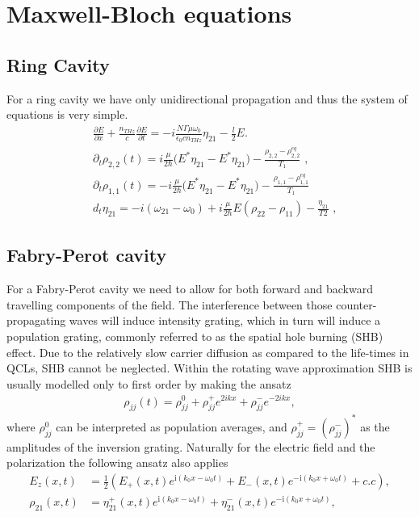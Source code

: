 \documentclass[preprint,secnumarabic,amssymb, nobibnotes, aip, prd]{revtex4-1}
\def\p{\partial}
\begin{document}
	\section{Maxwell-Bloch equations}
	\subsection{Ring Cavity}
	For a ring cavity we have only unidirectional propagation and thus the system of equations is very simple.  
	\begin{align}
	& \frac{\p E}{\p x}+ \frac{n_{THz}}{c} \frac{\p E}{\p t} = -i\frac{N\Gamma\mu\omega_0}{\epsilon_0 c n_{THz}}\eta_{21}-\frac{l}{2}E.
	\\
	& \partial_t {\rho_{2,2}(t)} = i\frac{ \mu }{2 \hbar} \Big ( E^* \eta_{21} - E^*\eta_{21} \Big) -\frac{\rho_{2,2}-\rho_{2,2}^{eq}}{T_1}\text{  ,}
	\\
	& \partial_t {\rho_{1,1}(t)} = - i\frac{ \mu }{2 \hbar} \Big ( E^* \eta_{21} - E^*\eta_{21} \Big) -\frac{\rho_{1,1}-\rho_{1,1}^{eq}}{T_1}
	\\
	& d_t \eta_{21} = -i(\omega_{21}-\omega_0)+i\frac{ \mu}{ 2 \hbar} E(\rho_{22}-\rho_{11}) - \frac{\eta_{21}}{T2} \text{  ,}
	\end{align}
	
	\subsection{Fabry-Perot cavity}
	
	For a Fabry-Perot cavity we need to allow for both forward and backward travelling components of the field. The interference between those counter-propagating waves will induce intensity grating, which in turn will induce a population grating, commonly referred to as the spatial hole burning (SHB) effect. Due to the relatively slow carrier diffusion as compared to the life-times in QCLs, SHB cannot be neglected. Within the rotating wave approximation SHB is usually modelled only to first order by making the ansatz 
	\begin{align}
	\rho_{jj}(t) = \rho_{jj}^{0} + \rho_{jj}^{+}e^{2ikx}+\rho_{jj}^{-}e^{-2ikx}, 
	\end{align}
	where $\rho_{jj}^{0}$ can be interpreted as population averages, and $\rho_{jj}^{+}=(\rho_{jj}^{-})^{\ast}$ as the amplitudes of the inversion grating. Naturally for the electric field and the polarization the following ansatz also applies 
	\begin{align}
	E_{z}(x,t) &=\frac{1}{2}\left( E_{+}(x,t)e^{\mathrm{i}(k_{0}x-\omega_{0}t)} +E_{-}(x,t)e^{-\mathrm{i}(k_{0}x+\omega_{0}t)}  +c.c\right)  , \label{eq:e-ansatz} \\
	\rho_{21}(x,t)  &  =\eta_{21}^{+}(x,t)e^{  \mathrm{i}(k_{0}x-\omega_{0}t)}  +\eta_{21}^{-}(x,t)e^{-\mathrm{i}(k_{0}x+\omega_{0}t)}  ,\label{eq:21ansatz}
	\end{align}
	
\end{document}

